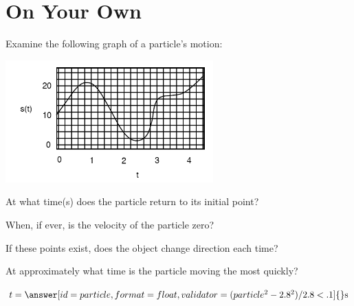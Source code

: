 \documentclass{ximera}
\begin{document}
\section{On Your Own}
\begin{question}
Examine the following graph of a particle's motion:

\begin{image}
    \includegraphics[width=80mm]{position.png}
\end{image}

At what time(s) does the particle return to its initial point?

\begin{selectAll}
\end{selectAll}

When, if ever, is the velocity of the particle zero?

\begin{selectAll}
\end{selectAll}

If these points exist, does the object change direction each time?

\begin{multipleChoice}
\end{multipleChoice}

At approximately what time is the particle moving the most quickly?

$t = \answer[id=particle,format=float,validator= (particle^2-2.8^2)/2.8 < .1]{} \text{s}$
\end{question}
\end{document}
